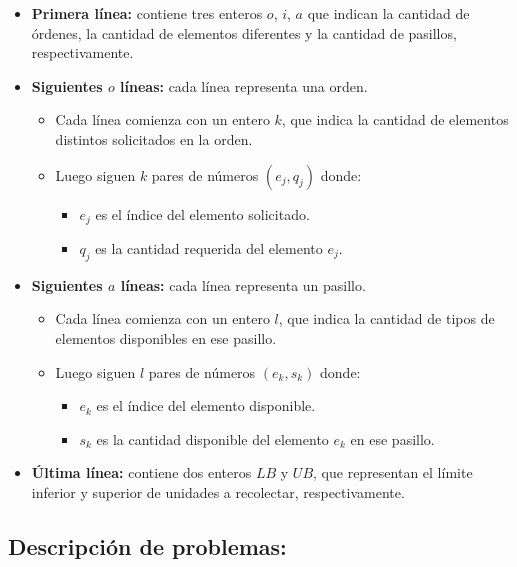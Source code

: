 \documentclass[a4paper,12pt]{article}
\begin{document}
\begin{itemize}
    \item \textbf{Primera línea:} contiene tres enteros $o$, $i$, $a$ que indican la cantidad de órdenes, la cantidad de elementos diferentes y la cantidad de pasillos, respectivamente.

    \item \textbf{Siguientes $o$ líneas:} cada línea representa una orden. 
    \begin{itemize}
        \item Cada línea comienza con un entero $k$, que indica la cantidad de elementos distintos solicitados en la orden.
        \item Luego siguen $k$ pares de números $(e_j, q_j)$ donde:
        \begin{itemize}
            \item $e_j$ es el índice del elemento solicitado.
            \item $q_j$ es la cantidad requerida del elemento $e_j$.
        \end{itemize}
    \end{itemize}

    \item \textbf{Siguientes $a$ líneas:} cada línea representa un pasillo.
    \begin{itemize}
        \item Cada línea comienza con un entero $l$, que indica la cantidad de tipos de elementos disponibles en ese pasillo.
        \item Luego siguen $l$ pares de números $(e_k, s_k)$ donde:
        \begin{itemize}
            \item $e_k$ es el índice del elemento disponible.
            \item $s_k$ es la cantidad disponible del elemento $e_k$ en ese pasillo.
        \end{itemize}
    \end{itemize}

    \item \textbf{Última línea:} contiene dos enteros $LB$ y $UB$, que representan el límite inferior y superior de unidades a recolectar, respectivamente.
\end{itemize}

\subsection{Descripción de problemas:}
\end{document}
